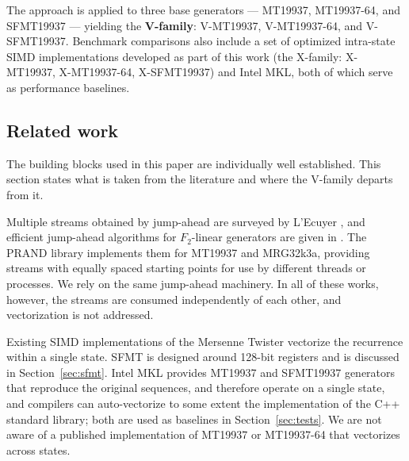 \documentclass[preprint,1p,times]{elsarticle}
\begin{document}
The approach is applied to three base generators --- MT19937, MT19937-64, and SFMT19937 --- yielding the \textbf{V-family}: V-MT19937, V-MT19937-64, and V-SFMT19937. Benchmark comparisons also include a set of optimized intra-state SIMD implementations developed as part of this work (the X-family: X-MT19937, X-MT19937-64, X-SFMT19937) and Intel MKL, both of which serve as performance baselines.

\subsection{Related work}
\label{sec:related}
The building blocks used in this paper are individually well established. This section states what is taken from the literature and where the V-family departs from it.

Multiple streams obtained by jump-ahead are surveyed by L'Ecuyer \cite{multistream}, and efficient jump-ahead algorithms for $F_2$-linear generators are given in \cite{jump1, jump2}. The PRAND library \cite{prand} implements them for MT19937 and MRG32k3a, providing streams with equally spaced starting points for use by different threads or processes. We rely on the same jump-ahead machinery. In all of these works, however, the streams are consumed independently of each other, and vectorization is not addressed.

Existing SIMD implementations of the Mersenne Twister vectorize the recurrence within a single state. SFMT \cite{sfmt19937} is designed around 128-bit registers and is discussed in Section~\ref{sec:sfmt}. Intel MKL provides MT19937 and SFMT19937 generators that reproduce the original sequences, and therefore operate on a single state, and compilers can auto-vectorize to some extent the implementation of the C++ standard library; both are used as baselines in Section~\ref{sec:tests}. We are not aware of a published implementation of MT19937 or MT19937-64 that vectorizes across states.
\end{document}
